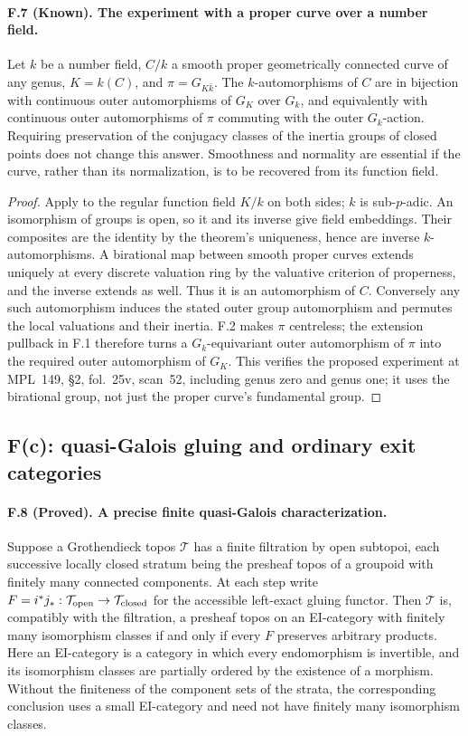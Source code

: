 \paragraph{F.7 (Known). The experiment with a proper
curve over a number field.}
Let $k$ be a number field, $C/k$ a smooth proper geometrically connected
curve of any genus, $K=k(C)$, and
$\pi=G_{K\bar k}$. The $k$-automorphisms of $C$ are in bijection with
continuous outer automorphisms of $G_K$ over $G_k$, and equivalently with
continuous outer automorphisms of $\pi$ commuting with the outer
$G_k$-action. Requiring preservation of the conjugacy classes of the
inertia groups of closed points does not change this answer. Smoothness
and normality are essential if the curve, rather than its normalization,
is to be recovered from its function field.

\begin{proof}
Apply \cite[Theorem~B, Theorem~17.1 in the body]{Mochizuki1999} to the
regular function field $K/k$ on both sides; $k$ is sub-$p$-adic. An
isomorphism of groups is open, so it and its inverse give field embeddings.
Their composites are the identity by the theorem's uniqueness, hence
are inverse $k$-automorphisms. A birational map between smooth proper
curves extends uniquely at every discrete valuation ring by the valuative
criterion of properness, and the inverse extends as well. Thus it is an
automorphism of $C$. Conversely any such automorphism induces the stated
outer group automorphism and permutes the local valuations and their
inertia. F.2 makes $\pi$ centreless; the extension pullback in F.1 therefore
turns a $G_k$-equivariant outer automorphism of $\pi$ into the required
outer automorphism of $G_K$. This verifies the proposed experiment at
MPL~149, \S2, fol.~25v, scan~52, including genus zero and genus one; it uses the
birational group, not just the proper curve's fundamental group.
\end{proof}

\subsection{F(c): quasi-Galois gluing and ordinary exit categories}

\paragraph{F.8 (Proved). A precise finite quasi-Galois characterization.}
Suppose a Grothendieck topos $\mathcal T$ has a finite filtration by open
subtopoi, each successive locally closed stratum being the presheaf topos
of a groupoid with finitely many connected components. At each step write
$F=i^*j_*:\mathcal T_{\rm open}\to\mathcal T_{\rm closed}$ for the
accessible left-exact gluing functor. Then $\mathcal T$ is, compatibly with
the filtration, a presheaf topos on an EI-category with finitely many
isomorphism classes if and only if every $F$ preserves arbitrary products.
Here an EI-category is a category in which every endomorphism is
invertible, and its isomorphism classes are partially ordered by the
existence of a morphism. Without the finiteness of the component sets of
the strata, the corresponding conclusion uses a small EI-category and
need not have finitely many isomorphism classes.

